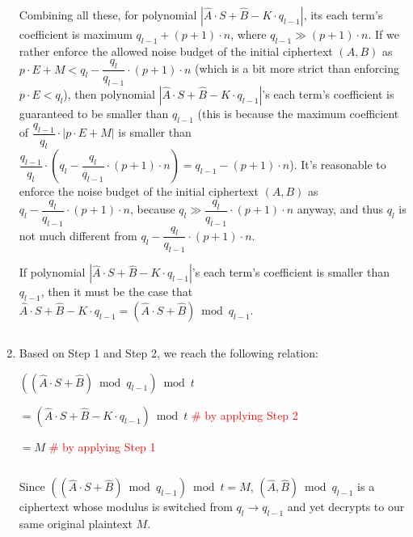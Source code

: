 \begin{myproof}
\begin{enumerate}
$ $

Combining all these, for polynomial $|\hat A\cdot S + \hat B - K\cdot q_{l-1}|$, its each term's coefficient is maximum $q_{l-1} + (p + 1)\cdot n$, where $q_{l-1} \gg (p+1) \cdot n$. If we rather enforce the allowed noise budget of the initial ciphertext $(A, B)$ as $p\cdot E + M< q_{l} - \dfrac{q_l}{q_{l - 1}}\cdot (p + 1)\cdot n$ (which is a bit more strict than enforcing $p\cdot E < q_{l}$), then polynomial $|\hat A\cdot S + \hat B - K\cdot q_{l-1}|$'s each term's coefficient is guaranteed to be smaller than $q_{l - 1}$ (this is because the maximum coefficient of $\dfrac{q_{l-1}}{q_l}\cdot|p\cdot E + M|$ is smaller than $\dfrac{q_{l-1}}{q_l}\cdot (q_{l} - \dfrac{q_l}{q_{l - 1}}\cdot (p + 1)\cdot n) = q_{l-1} - (p + 1) \cdot n$). It's reasonable to enforce the noise budget of the initial ciphertext $(A, B)$ as $q_{l} - \dfrac{q_l}{q_{l - 1}}\cdot (p + 1)\cdot n$, because $q_{l} \gg \dfrac{q_l}{q_{l - 1}}\cdot (p + 1)\cdot n$ anyway, and thus $q_l$ is not much different from $q_l - \dfrac{q_l}{q_{l - 1}}\cdot (p + 1)\cdot n$. %


If polynomial $|\hat A\cdot S + \hat B - K\cdot q_{l-1}|$'s each term's coefficient is smaller than $q_{l - 1}$, then it must be the case that $\hat A\cdot S + \hat B - K\cdot q_{l-1} = (\hat A\cdot S + \hat B) \bmod q_{l-1}$.

$ $

\item Based on Step 1 and Step 2, we reach the following relation: 

$((\hat A\cdot S + \hat B) \bmod q_{l-1}) \bmod t$

$= (\hat A\cdot S+ \hat B - K\cdot q_{l-1}) \bmod t$   \textcolor{red}{ \# by applying Step 2}

$= M$   \textcolor{red}{ \# by applying Step 1}

$ $

Since $((\hat A\cdot S + \hat B) \bmod q_{l-1}) \bmod t = M$, 
$(\hat A, \hat B) \bmod q_{l-1}$ is a ciphertext whose modulus is switched from $q_l \rightarrow q_{l-1}$ and yet decrypts to our same original plaintext $M$.

\end{enumerate}    
\end{myproof}


